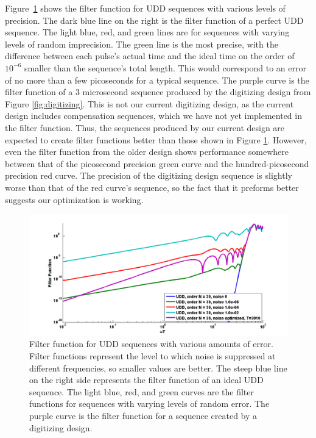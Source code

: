 \documentclass[pdftex,12pt,a4paper]{article}
\begin{document}
Figure~\ref{fig:filter1} shows the filter function for UDD sequences with various levels of precision. The dark blue line on the right is the filter function of a perfect UDD sequence. The light blue, red, and green lines are for sequences with varying levels of random imprecision. The green line is the most precise, with the difference between each pulse's actual time and the ideal time on the order of $10^{-6}$ smaller than the sequence's total length. This would correspond to an error of no more than a few picoseconds for a typical sequence. The purple curve is the filter function of a 3 microsecond sequence produced by the digitizing design from Figure \ref{fig:digitizing}. This is not our current digitizing design, as the current design includes compensation sequences, which we have not yet implemented in the filter function. Thus, the sequences produced by our current design are expected to create filter functions better than those shown in Figure \ref{fig:filter1}. However, even the filter function from the older design shows performance somewhere between that of the picosecond precision green curve and the hundred-picosecond precision red curve. 
The precision of the digitizing design sequence is slightly worse than that of the red curve's sequence, so the fact that it preforms better suggests our optimization is working.

\begin{figure}[H]
  \centering
    \includegraphics[width=\textwidth]{filter_opt_30_3010.png}
  \caption{Filter function for UDD sequences with various amounts of error. Filter functions represent the level to which noise is suppressed at different frequencies, so smaller values are better. The steep blue line on the right side represents the filter function of an ideal UDD sequence. The light blue, red, and green curves are the filter functions for sequences with varying levels of random error. The purple curve is the filter function for a sequence created by a digitizing design.}
  \label{fig:filter1}
\end{figure}
\end{document}
